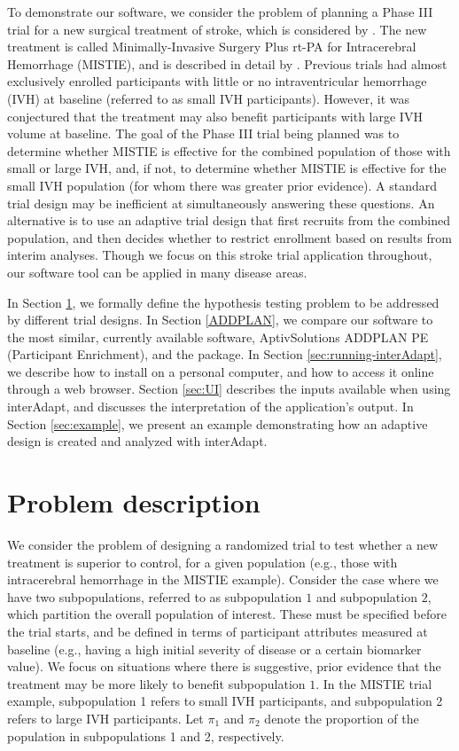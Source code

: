 \documentclass[article]{jss}
\begin{document}
To demonstrate our software, we consider the problem of 
 planning a Phase III trial for a new surgical treatment of stroke, which is considered by \cite{Rosenblum2013AdaptMISTIE}.
The new treatment is  called Minimally-Invasive Surgery Plus rt-PA for Intracerebral Hemorrhage (MISTIE), and is described in detail by \cite{MISTIE_prelim2008}. 
Previous trials had almost exclusively enrolled participants with little or no intraventricular hemorrhage (IVH) at baseline (referred to as small IVH participants).
However, it was conjectured that the treatment may also benefit  participants with large IVH volume at baseline.  
The goal of the Phase III trial being planned was to determine whether MISTIE is effective for the combined population of those with small or large IVH, and, if not, to determine whether MISTIE is effective for the small IVH population (for whom there was greater prior evidence). A  standard trial design  may be inefficient at simultaneously answering these questions.
An alternative is to use an adaptive trial design that  first recruits from the combined population, and then decides whether to restrict enrollment based on results from interim  analyses. 
Though we focus on this stroke trial application throughout, our software tool can be applied in many disease areas.


In Section \ref{sec:problemDescription}, we  formally define the hypothesis testing problem to be addressed by different trial designs. In Section \ref{ADDPLAN}, we compare our software to the most similar, currently available software, AptivSolutions ADDPLAN PE (Participant Enrichment), and the   package. 
In Section \ref{sec:running-interAdapt}, we describe how to install  on a personal computer, and how to access it online through a web browser. Section \ref{sec:UI} describes the inputs available when using \textsf{interAdapt}, and discusses the interpretation of the application's output. In Section \ref{sec:example}, we present an example demonstrating how an adaptive design is created and analyzed with \textsf{interAdapt}. 

\section{Problem description}
\label{sec:problemDescription}

We consider the problem of designing a randomized trial to test whether a new treatment is superior to control, for a given population (e.g., those with intracerebral hemorrhage in  the MISTIE example).
Consider the case where we have two subpopulations, referred to as subpopulation $1$ and subpopulation $2$, which partition the overall population of interest. These must be specified before the trial starts, and be defined in terms of participant attributes measured at baseline (e.g., having a high initial severity of disease or a certain biomarker value). 
We focus on situations where  there is suggestive, prior evidence that the treatment may be more likely to benefit subpopulation $1$.
In the MISTIE trial example, subpopulation 1 refers to small IVH participants, and subpopulation 2 refers to large IVH participants. 
Let $π_1$ and $π_2$ denote the proportion of the population in subpopulations 1 and 2, respectively.
\end{document}
